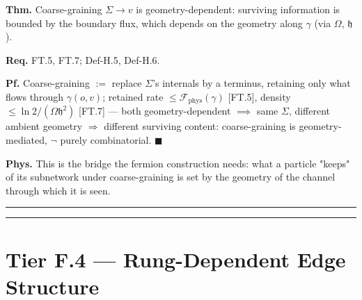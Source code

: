 \begin{theorem}\label{tag:FT-8}
\textbf{Thm.} Coarse-graining $\Sigma\to v$ is geometry-dependent: surviving information is bounded by the boundary flux, which depends on the geometry along $\gamma$ (via $\Omega$, $\mathfrak h$).

\textbf{Req.} FT.5, FT.7; Def-H.5, Def-H.6.

\textbf{Pf.} Coarse-graining $:=$ replace $\Sigma$'s internals by a terminus, retaining only what flows through $\gamma(o,v)$; retained rate $\le\mathcal F_{\mathrm{phys}}(\gamma)$ [FT.5], density $\le\ln2/(\Omega\mathfrak h^2)$ [FT.7] — both geometry-dependent $\implies$ same $\Sigma$, different ambient geometry $\Rightarrow$ different surviving content: coarse-graining is geometry-mediated, $\neg$ purely combinatorial. $\blacksquare$

\textbf{Phys.} This is the bridge the fermion construction needs: what a particle "keeps" of its subnetwork under coarse-graining is set by the geometry of the channel through which it is seen.

\vspace{2pt}\noindent\rule{\textwidth}{0.4pt}\vspace{2pt}

\vspace{2pt}\noindent\rule{\textwidth}{0.4pt}\vspace{2pt}

\end{theorem}

\section[Tier F.4 — Rung-Dependent Edge Structure]{\texorpdfstring{Tier F.4 — Rung-Dependent Edge Structure}{Tier F.4 - Rung-Dependent Edge Structure}}

